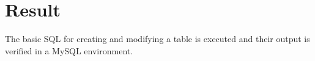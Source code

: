 \documentclass[13pt,oneside]{book}
\begin{document}
	\section*{Result}
	The basic SQL for creating and modifying a table is executed and their output
	is verified in a MySQL environment.
\end{document}

